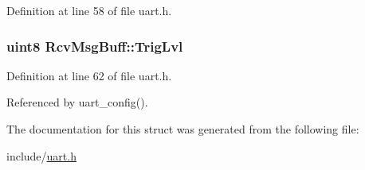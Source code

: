 Definition at line 58 of file uart.\-h.

\hypertarget{structRcvMsgBuff_a142735d44b7fefc09c930d58b5e70d4d}{
\subsubsection[{Trig\-Lvl}]{\setlength{\rightskip}{0pt plus 5cm}uint8 Rcv\-Msg\-Buff\-::\-Trig\-Lvl}}\label{structRcvMsgBuff_a142735d44b7fefc09c930d58b5e70d4d}


Definition at line 62 of file uart.\-h.



Referenced by uart\-\_\-config().



The documentation for this struct was generated from the following file\-:\begin{DoxyCompactItemize}
\item 
include/\hyperlink{uart_8h}{uart.\-h}\end{DoxyCompactItemize}
